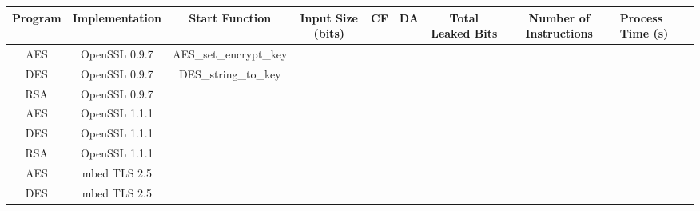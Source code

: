 \begin{table*}[t]
    \begin{tabular}{|c|c|c|c|c|c|c|c|l|}
    \hline
    Program                   & Implementation                     & Start Function         & Input Size (bits)     & CF                    & DA                    & Total Leaked Bits     & Number of Instructions & Process Time (s) \\ \hline
    AES                       & OpenSSL 0.9.7                      & AES\_set\_encrypt\_key &                       &                       &                       &                       &                        &                  \\
    DES                       & OpenSSL 0.9.7                      & DES\_string\_to\_key   &                       &                       &                       &                       &                        &                  \\
    RSA                       & OpenSSL 0.9.7                      &                        &                       &                       &                       &                       &                        &                  \\
    AES                       & OpenSSL 1.1.1                      &                        &                       &                       &                       &                       &                        &                  \\
    DES                       & OpenSSL 1.1.1                      &                        &                       &                       &                       &                       &                        &                  \\
    RSA                       & OpenSSL 1.1.1                      &                        &                       &                       &                       &                       &                        &                  \\
    AES                       & mbed TLS 2.5                       &                        &                       &                       &                       &                       &                        &                  \\
    DES                       & mbed TLS 2.5                       &                        &                       &                       &                       &                       &                        &                  \\

\end{tabular}
\end{table*}
